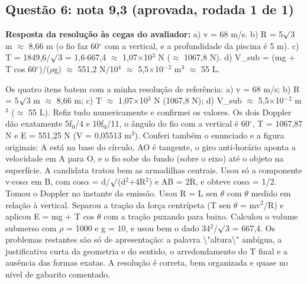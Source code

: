 \documentclass{article}%
\begin{document}
\subsection*{Questão 6: nota 9,3 (aprovada, rodada 1 de 1)}%
\textbf{Resposta da resolução às cegas do avaliador:} a) v = 68 m/s.\newline%
b) R = 5$\surd$3 m $\approx$ 8,66 m (o fio faz 60$^\circ$ com a vertical, e a profundidade da piscina é 5 m).\newline%
c) T = 1849,6/$\surd$3 = 1,6$\cdot$667,4 $\approx$ 1,07$\times$10$^3$ N ($\approx$ 1067,8 N).\newline%
d) V\_sub = (mg + T cos 60$^\circ$)/($\rho$g) $\approx$ 551,2 N/10$^{4}$ $\approx$ 5,5$\times$10$^{-}$$^2$ m$^3$ $\approx$ 55 L.\par %
Os quatro itens batem com a minha resolução de referência: a) v = 68 m/s; b) R = 5$\surd$3 m $\approx$ 8,66 m; c) T $\approx$ 1,07$\times$10$^3$ N (1067,8 N); d) V\_sub $\approx$ 5,5$\times$10$^{-}$$^2$ m$^3$ ($\approx$ 55 L). Refiz tudo numericamente e confirmei os valores. Os dois Doppler dão exatamente 5f$_{0}$/4 e 10f$_{0}$/11, o ângulo do fio com a vertical é 60$^\circ$, T = 1067,87 N e E = 551,25 N (V = 0,05513 m$^3$). Conferi também o enunciado e a figura originais: A está na base do círculo, AO é tangente, o giro anti{-}horário aponta a velocidade em A para O, e o fio sobe do fundo (sobre o eixo) até o objeto na superfície. A candidata tratou bem as armadilhas centrais. Usou só a componente v$\cdot$cos$\alpha$ em B, com cos$\alpha$ = d/$\surd$(d$^2$+4R$^2$) e AB = 2R, e obteve cos$\alpha$ = 1/2. Tomou o Doppler no instante da emissão. Usou R = L sen $\theta$ com $\theta$ medido em relação à vertical. Separou a tração da força centrípeta (T sen $\theta$ = mv$^2$/R) e aplicou E = mg + T cos $\theta$ com a tração puxando para baixo. Calculou o volume submerso com $\rho$ = 1000 e g = 10, e usou bem o dado 34$^2$/$\surd$3 = 667,4. Os problemas restantes são só de apresentação: a palavra \textbackslash{}"altura\textbackslash{}" ambígua, a justificativa curta da geometria e do sentido, o arredondamento do T final e a ausência das formas exatas. A resolução é correta, bem organizada e quase no nível de gabarito comentado.%
\end{document}
